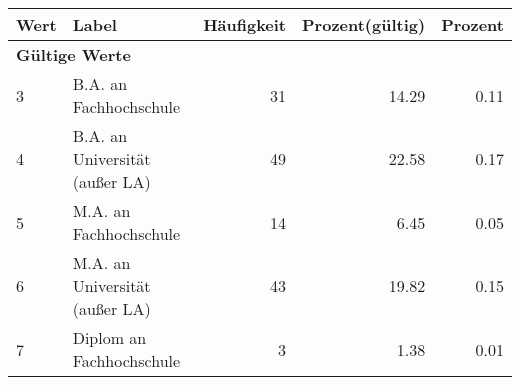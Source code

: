      \begin{longtable}{lXrrr}
     \toprule
     \textbf{Wert} & \textbf{Label} & \textbf{Häufigkeit} & \textbf{Prozent(gültig)} & \textbf{Prozent} \\
     \endhead
     \midrule
     \multicolumn{5}{l}{\textbf{Gültige Werte}}\\

     3 &
     \multicolumn{1}{X}{ B.A. an Fachhochschule   } &


       \num{31} &
       \num[round-mode=places,round-precision=2]{14.29} &
         \num[round-mode=places,round-precision=2]{0.11} \\

     4 &
     \multicolumn{1}{X}{ B.A. an Universität (außer LA)   } &


       \num{49} &
       \num[round-mode=places,round-precision=2]{22.58} &
         \num[round-mode=places,round-precision=2]{0.17} \\

     5 &
     \multicolumn{1}{X}{ M.A. an Fachhochschule   } &


       \num{14} &
       \num[round-mode=places,round-precision=2]{6.45} &
         \num[round-mode=places,round-precision=2]{0.05} \\

     6 &
     \multicolumn{1}{X}{ M.A. an Universität (außer LA)   } &


       \num{43} &
       \num[round-mode=places,round-precision=2]{19.82} &
         \num[round-mode=places,round-precision=2]{0.15} \\

     7 &
     \multicolumn{1}{X}{ Diplom an Fachhochschule   } &


       \num{3} &
       \num[round-mode=places,round-precision=2]{1.38} &
         \num[round-mode=places,round-precision=2]{0.01} \\


\end{longtable}
